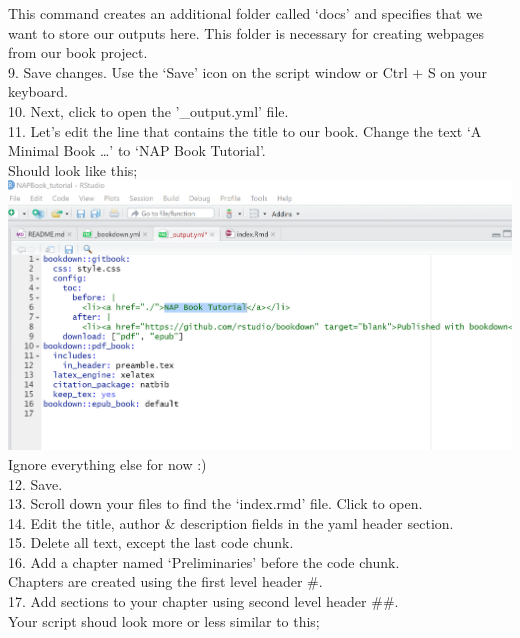 \documentclass[
]{book}
\begin{document}
This command creates an additional folder called `docs' and specifies that we want to store our outputs here. This folder is necessary for creating webpages from our book project.\\
9. Save changes. Use the `Save' icon on the script window or Ctrl + S on your keyboard.\\
10. Next, click to open the '\_output.yml' file.\\
11. Let's edit the line that contains the title to our book. Change the text `A Minimal Book \ldots{}' to `NAP Book Tutorial'.\\
Should look like this;
\includegraphics{tutorial_screenshots/edit_title_output_yaml.png}\\
Ignore everything else for now :)\\
12. Save.\\
13. Scroll down your files to find the `index.rmd' file. Click to open.\\
14. Edit the title, author \& description fields in the yaml header section.\\
15. Delete all text, except the last code chunk.\\
16. Add a chapter named `Preliminaries' before the code chunk.\\
Chapters are created using the first level header \#.\\
17. Add sections to your chapter using second level header \#\#.\\
Your script shoud look more or less similar to this;
\end{document}
